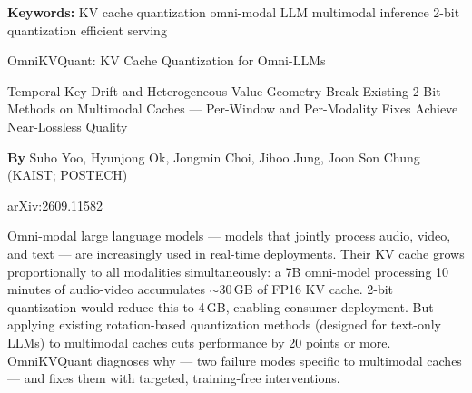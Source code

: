 \documentclass[10pt,twocolumn]{article}
\begin{document}
\setlength{\parindent}{0pt}
\setlength{\parskip}{4pt}

{\small\color{keywordgray}\textbf{Keywords:}
  KV cache quantization \textbullet{}
  omni-modal LLM \textbullet{}
  multimodal inference \textbullet{}
  2-bit quantization \textbullet{}
  efficient serving}\par\vspace{4pt}

{\LARGE\bfseries\raggedright
  OmniKVQuant: KV Cache Quantization
  for Omni-LLMs}\par\vspace{4pt}

{\large\itshape\raggedright
  Temporal Key Drift and Heterogeneous Value Geometry Break
  Existing 2-Bit Methods on Multimodal Caches ---
  Per-Window and Per-Modality Fixes Achieve Near-Lossless Quality}\par\vspace{6pt}

{\small\textbf{By} Suho Yoo, Hyunjong Ok, Jongmin Choi,
  Jihoo Jung, Joon Son Chung
  (KAIST; POSTECH)}\par\vspace{2pt}

{\small\color{keywordgray}arXiv:2609.11582}
\par\vspace{2pt}\noindent{\color{rulered}\rule{\columnwidth}{0.6pt}}\vspace{6pt}

Omni-modal large language models --- models that jointly process audio,
video, and text --- are increasingly used in real-time deployments.
Their KV cache grows proportionally to all modalities simultaneously:
a 7B omni-model processing 10 minutes of audio-video accumulates
$\sim$30\,GB of FP16 KV cache. 2-bit quantization would reduce this
to 4\,GB, enabling consumer deployment. But applying existing
rotation-based quantization methods (designed for text-only LLMs)
to multimodal caches cuts performance by 20 points or more.
OmniKVQuant diagnoses why --- two failure modes specific to multimodal
caches --- and fixes them with targeted, training-free interventions.
\end{document}
